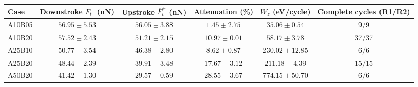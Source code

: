 \begin{tabular*}{\textwidth}{@{\extracolsep{\fill}}lccccc@{}}\toprule
Case & Downstroke $\overline{F}_t^-$ (nN) & Upstroke $\overline{F}_t^+$ (nN) & Attenuation (\%) & $\overline{W}_z$ (eV/cycle) & Complete cycles (R1/R2)\\\midrule
A10B05 & $56.95 \pm 5.53$ & $56.05 \pm 3.88$ & $1.45 \pm 2.75$ & $35.06 \pm 0.54$ & 9/9 \\
A10B20 & $57.52 \pm 2.43$ & $51.21 \pm 2.15$ & $10.97 \pm 0.01$ & $58.17 \pm 3.78$ & 37/37 \\
A25B10 & $50.77 \pm 3.54$ & $46.38 \pm 2.80$ & $8.62 \pm 0.87$ & $230.02 \pm 12.85$ & 6/6 \\
A25B20 & $48.44 \pm 2.39$ & $39.91 \pm 3.48$ & $17.67 \pm 3.12$ & $211.18 \pm 4.39$ & 15/15 \\
A50B20 & $41.42 \pm 1.30$ & $29.57 \pm 0.59$ & $28.55 \pm 3.67$ & $774.15 \pm 50.70$ & 6/6 \\
\bottomrule
\end{tabular*}
